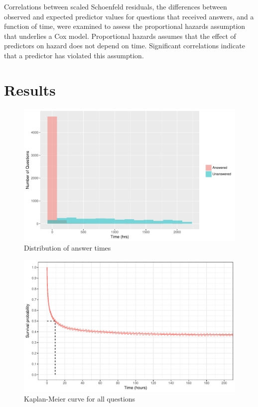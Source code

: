 \documentclass{article}
\begin{document}
Correlations between scaled Schoenfeld residuals, the differences between observed and expected predictor values for questions that received answers, and a function of time, were examined to assess the proportional hazards assumption that underlies a Cox model. Proportional hazards assumes that the effect of predictors on hazard does not depend on time. Significant correlations indicate that a predictor has violated this assumption. 


\section*{Results}


\begin{figure}[h!]
  \includegraphics[scale=1]{times_dist.pdf}
  \caption{Distribution of answer times}
  \label{fig:answertimes}
\end{figure}

\begin{figure}[h!]
  \includegraphics[scale=1]{kmcurve.pdf}
  \caption{Kaplan-Meier curve for all questions}
  \label{fig:kmcurve}
\end{figure}
\end{document}
